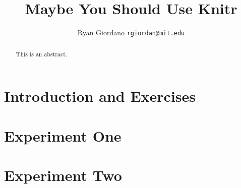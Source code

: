 \documentclass[11pt]{article}
\begin{document}
\title{Maybe You Should Use Knitr}

\author{Ryan Giordano \texttt{rgiordan@mit.edu}}

\maketitle

\begin{abstract}
This is an abstract.
\end{abstract}

\section{Introduction and Exercises}


\section{Experiment One}


\section{Experiment Two}



\end{document}
